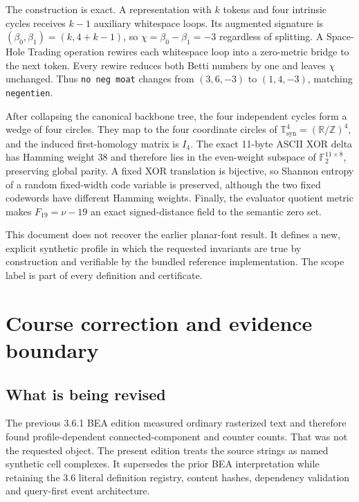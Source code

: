 \documentclass[10pt,a4paper]{article}
\newcommand{\code}[1]{\texttt{#1}}
\newcommand{\Ftwo}{\mathbb F_2}
\newcommand{\Tfour}{\mathbb T^4_{\mathrm{syn}}}
\newcommand{\bettiZero}{\beta_0}
\newcommand{\bettiOne}{\beta_1}
\begin{document}
The construction is exact. A representation with $k$ tokens and four intrinsic cycles receives $k-1$ auxiliary whitespace loops. Its augmented signature is $(\bettiZero,\bettiOne)=(k,4+k-1)$, so $\chi=\bettiZero-\bettiOne=-3$ regardless of splitting. A Space-Hole Trading operation rewires each whitespace loop into a zero-metric bridge to the next token. Every rewire reduces both Betti numbers by one and leaves $\chi$ unchanged. Thus \code{no neg moat} changes from $(3,6,-3)$ to $(1,4,-3)$, matching \code{negentien}.

After collapsing the canonical backbone tree, the four independent cycles form a wedge of four circles. They map to the four coordinate circles of $\Tfour=(\mathbb R/\mathbb Z)^4$, and the induced first-homology matrix is $I_4$. The exact 11-byte ASCII XOR delta has Hamming weight 38 and therefore lies in the even-weight subspace of $\Ftwo^{11\times8}$, preserving global parity. A fixed XOR translation is bijective, so Shannon entropy of a random fixed-width code variable is preserved, although the two fixed codewords have different Hamming weights. Finally, the evaluator quotient metric makes $F_{19}=\nu-19$ an exact signed-distance field to the semantic zero set.

\begin{decisionbox}
This document does not recover the earlier planar-font result. It defines a new, explicit synthetic profile in which the requested invariants are true by construction and verifiable by the bundled reference implementation. The scope label is part of every definition and certificate.
\end{decisionbox}

\tableofcontents
\clearpage
{}

\section{Course correction and evidence boundary}

\subsection{What is being revised}
The previous 3.6.1 BEA edition measured ordinary rasterized text and therefore found profile-dependent connected-component and counter counts. That was not the requested object. The present edition treats the source strings as named synthetic cell complexes. It supersedes the prior BEA interpretation while retaining the 3.6 literal definition registry, content hashes, dependency validation and query-first event architecture.
\end{document}
